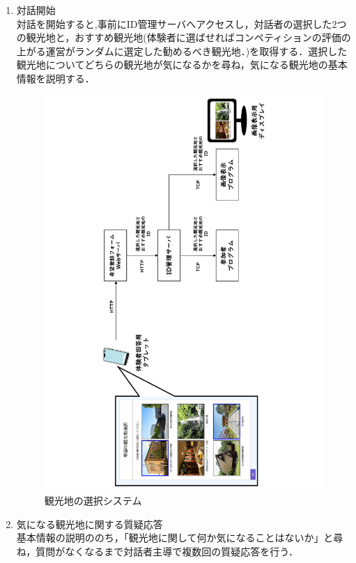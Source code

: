 \begin{enumerate}
    \item 対話開始\\
            対話を開始すると,事前にID管理サーバへアクセスし，対話者の選択した2つの観光地と，おすすめ観光地(体験者に選ばせればコンペティションの評価の上がる運営がランダムに選定した勧めるべき観光地．)を取得する．選択した観光地についてどちらの観光地が気になるかを尋ね，気になる観光地の基本情報を説明する．
            \begin{figure}[th]
                \centering
                \includegraphics[scale=0.4,angle=270]{pic/how2choice.pdf}
                \caption{観光地の選択システム}
            \end{figure}

    \item 気になる観光地に関する質疑応答\\
            基本情報の説明ののち，「観光地に関して何か気になることはないか」と尋ね，質問がなくなるまで対話者主導で複数回の質疑応答を行う．


\end{enumerate}
